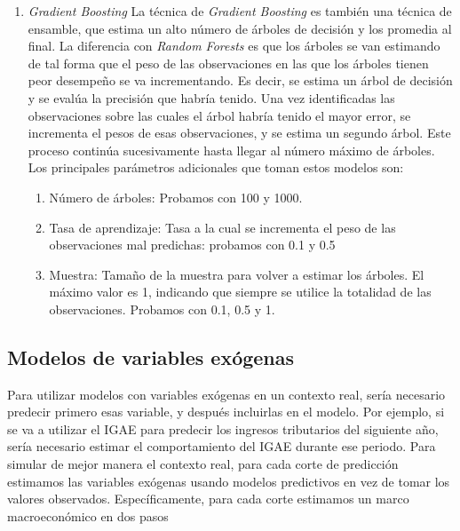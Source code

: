 \documentclass[a4paper, 11pt]{article}
\begin{document}
\begin{enumerate}
\item \textit{Gradient Boosting}
La técnica de \textit{Gradient Boosting} es también una técnica de ensamble, que estima un alto número de árboles de decisión y los promedia al final. La diferencia con \textit{Random Forests} es que los árboles se van estimando de tal forma que el peso de las observaciones en las que los árboles tienen peor desempeño se va incrementando. Es decir, se estima un árbol de decisión y se evalúa la precisión que habría tenido. Una vez identificadas las observaciones sobre las cuales el árbol habría tenido el mayor error, se incrementa el pesos de esas observaciones, y se estima un segundo árbol. Este proceso continúa sucesivamente hasta llegar al número máximo de árboles. Los principales parámetros adicionales que toman estos modelos son:
\begin{enumerate}
\item Número de árboles: Probamos con 100 y 1000.
\item Tasa de aprendizaje: Tasa a la cual se incrementa el peso de las observaciones mal predichas: probamos con 0.1 y 0.5
\item Muestra: Tamaño de la muestra para volver a estimar los árboles. El máximo valor es 1, indicando que siempre se utilice la totalidad de las observaciones. Probamos con 0.1, 0.5 y 1.
\end{enumerate}
\end{enumerate}

\subsection*{Modelos de variables exógenas}
Para utilizar modelos con variables exógenas en un contexto real, sería necesario predecir primero esas variable, y después incluirlas en el modelo. Por ejemplo, si se va a utilizar el IGAE para predecir los ingresos tributarios del siguiente año, sería necesario estimar el comportamiento del IGAE durante ese periodo. Para simular de mejor manera el contexto real, para cada corte de predicción estimamos las variables exógenas usando modelos predictivos en vez de tomar los valores observados. Específicamente, para cada corte estimamos un marco macroeconómico en dos pasos
\end{document}
